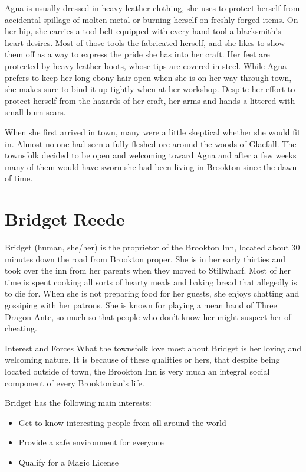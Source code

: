\begin{multicols}{2}
Agna is usually dressed in heavy leather clothing, she uses to protect herself from accidental spillage of molten metal or burning herself on freshly forged items.
On her hip, she carries a tool belt equipped with every hand tool a blacksmith's heart desires.
Most of those tools the fabricated herself, and she likes to show them off as a way to express the pride she has into her craft.
Her feet are protected by heavy leather boots, whose tips are covered in steel.
While Agna prefers to keep her long ebony hair open when she is on her way through town, she makes sure to bind it up tightly when at her workshop.
Despite her effort to protect herself from the hazards of her craft, her arms and hands a littered with small burn scars.

When she first arrived in town, many were a little skeptical whether she would fit in.
Almost no one had seen a fully fleshed orc around the woods of Glaefall.
The townsfolk decided to be open and welcoming toward Agna and after a few weeks many of them would have sworn she had been living in Brookton since the dawn  of time.

\section{Bridget Reede}

Bridget (human, she/her) is the proprietor of the Brookton Inn, located about 30 minutes down the road from Brookton proper.
She is in her early thirties and took over the inn from her parents when they moved to Stillwharf.
Most of her time is spent cooking all sorts of hearty meals and baking bread that allegedly is to die for.
When she is not preparing food for her guests, she enjoys chatting and gossiping with her patrons.
She is known for playing a mean hand of Three Dragon Ante, so much so that people who don't know her might suspect her of cheating.

\begin{DndSidebar}{Interest and Forces}
    What the townsfolk love most about Bridget is her loving and welcoming nature.
    It is because of these qualities or hers, that despite being located outside of town, the Brookton Inn is very much an integral social component of every Brooktonian's life.

    Bridget has the following main interests:
    \begin{itemize}
        \item{Get to know interesting people from all around the world}
        \item{Provide a safe environment for everyone}
        \item{Qualify for a Magic License}
    \end{itemize}


\end{DndSidebar}
\end{multicols}
